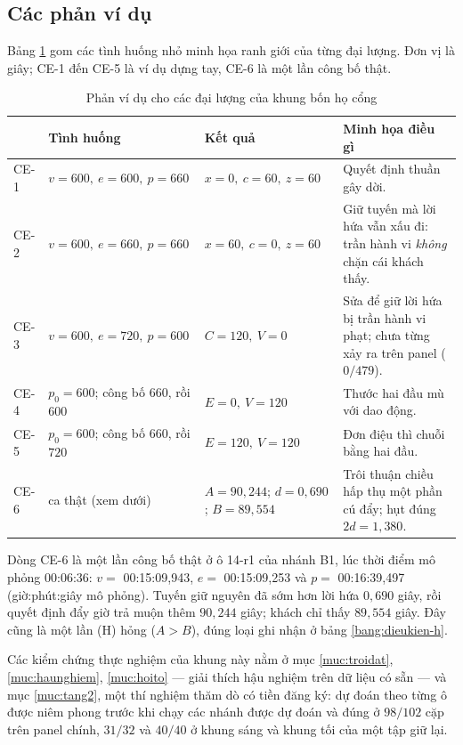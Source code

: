 \subsection{Các phản ví dụ}

Bảng \ref{bang:phanvidu} gom các tình huống nhỏ minh họa ranh giới của từng đại lượng. Đơn vị là
giây; CE-1 đến CE-5 là ví dụ dựng tay, CE-6 là một lần công bố thật.

\begin{table}[htbp]
\centering
\caption{Phản ví dụ cho các đại lượng của khung bốn họ cổng}
\label{bang:phanvidu}
\small
\begin{tabular}{@{}lp{3.9cm}p{3.1cm}p{5.2cm}@{}}
\toprule
& \textbf{Tình huống} & \textbf{Kết quả} & \textbf{Minh họa điều gì}\\
\midrule
CE-1 & $v = 600,\ e = 600,\ p = 660$ & $x = 0,\ c = 60,\ z = 60$ & Quyết định thuần gây dời.\\
CE-2 & $v = 600,\ e = 660,\ p = 660$ & $x = 60,\ c = 0,\ z = 60$ & Giữ tuyến mà lời hứa vẫn xấu
đi: trần hành vi \emph{không} chặn cái khách thấy.\\
CE-3 & $v = 600,\ e = 720,\ p = 600$ & $C = 120,\ V = 0$ & Sửa để giữ lời hứa bị trần hành vi
phạt; chưa từng xảy ra trên panel ($0/479$).\\
CE-4 & $p_0 = 600$; công bố $660$, rồi $600$ & $E = 0,\ V = 120$ & Thước hai đầu mù với dao
động.\\
CE-5 & $p_0 = 600$; công bố $660$, rồi $720$ & $E = 120,\ V = 120$ & Đơn điệu thì chuỗi bằng hai
đầu.\\
CE-6 & ca thật (xem dưới) & $A = 90{,}244$; $d = 0{,}690$; $B = 89{,}554$ & Trôi thuận chiều hấp
thụ một phần cú đẩy; hụt đúng $2d = 1{,}380$.\\
\bottomrule
\end{tabular}
\end{table}

Dòng CE-6 là một lần công bố thật ở ô 14-r1 của nhánh B1, lúc thời điểm mô phỏng 00:06:36:
$v = $ 00:15:09,943, $e = $ 00:15:09,253 và $p = $ 00:16:39,497 (giờ:phút:giây mô phỏng). Tuyến giữ
nguyên đã sớm hơn lời hứa $0{,}690$ giây, rồi quyết định đẩy giờ trả muộn thêm $90{,}244$ giây;
khách chỉ thấy $89{,}554$ giây. Đây cũng là một lần (H) hỏng ($A > B$), đúng loại ghi nhận ở bảng
\ref{bang:dieukien-h}.

Các kiểm chứng thực nghiệm của khung này nằm ở mục \ref{muc:troidat}, \ref{muc:haunghiem},
\ref{muc:hoito} --- giải thích hậu nghiệm trên dữ liệu có sẵn --- và mục \ref{muc:tang2}, một thí
nghiệm thăm dò có tiền đăng ký: dự đoán theo từng ô được niêm phong trước khi chạy các nhánh được
dự đoán và đúng ở
$98/102$ cặp trên panel chính, $31/32$ và $40/40$ ở khung sáng và khung tối của một tập giữ lại.

